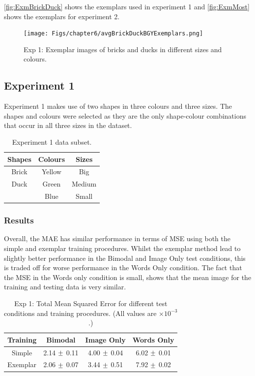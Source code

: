 \autoref{fig:ExmBrickDuck} shows the exemplars used in experiment 1 and \autoref{fig:ExmMost} shows the exemplars for experiment 2.

\begin{figure}[ht]
    \centering
    \texttt{[image: Figs/chapter6/avgBrickDuckBGYExemplars.png]}
    \caption{Exp 1: Exemplar images of bricks and ducks in different sizes and colours.}
    \label{fig:ExmBrickDuck}
\end{figure}


\subsection{Experiment 1}
Experiment 1 makes use of two shapes in three colours and three sizes. The shapes and colours were selected as they are the only shape-colour combinations that occur in all three sizes in the dataset.

\begin{table}[h]
\centering
\begin{tabular}{|c|c|c|}
\hline

\textbf{Shapes}  & \textbf{Colours} & \textbf{Sizes}\\ \hline \hline
Brick  & Yellow  & Big \\ \hline
Duck   & Green   & Medium \\ \hline
& Blue & Small \\ \hline
			  
			
\end{tabular}
\caption{Experiment 1 data subset.}
\label{tab:6_exp1_data} 
\end{table}


\subsubsection{Results}

Overall, the \ac{MAE} has similar performance in terms of \ac{MSE} using both the simple and exemplar training procedures. Whilst the exemplar method lead to slightly better performance in the Bimodal and Image Only test conditions, this is traded off for worse performance in the Words Only condition. The fact that the \ac{MSE} in the Words only condition is small, shows that the mean image for the training and testing data is very similar.

\begin{table}[h!]
\centering
	\begin{tabular}{|c|c|c|c|}
	\hline
\textbf{Training} & 	\textbf{Bimodal} & 	\textbf{Image Only} 	& 	\textbf{Words Only} \\ \hline
Simple & 2.14 $\mypm$ 0.11 & 4.00	$\mypm$ 0.04 & 6.02 $\mypm$ 	0.01 \\ \hline
Exemplar & 2.06 $\mypm$ 0.07 & 3.44 $\mypm$ 0.51 & 7.92	$\mypm$ 0.02 \\ \hline
\end{tabular}
\caption{Exp 1: Total Mean Squared Error for different test conditions and training procedures. (All values are $\times10^{-3}$.)}
\label{tab:6_res_exp1}
\end{table}

